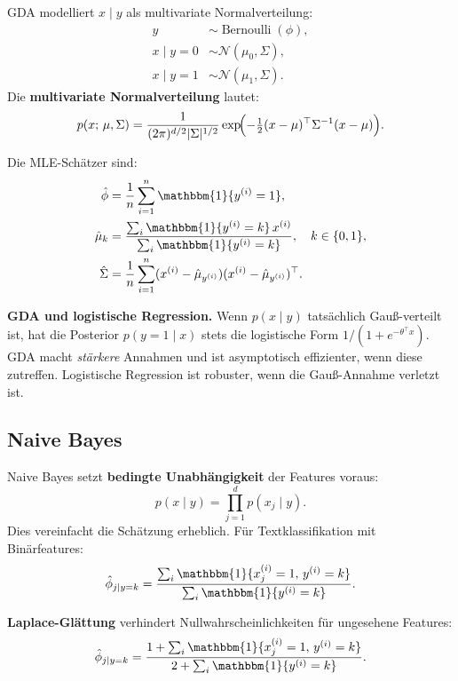 \documentclass[11pt]{article}
\theoremstyle{csthm}
\theoremstyle{csdef}
\newcommand{\I}{\mathbbm{1}}
\newcommand{\N}{\mathcal{N}}
\newcommand{\T}{^\top}
\begin{document}
GDA modelliert $x \mid y$ als multivariate Normalverteilung:
\begin{align}
  y &\sim \operatorname{Bernoulli}(\phi), \\
  x \mid y=0 &\sim \N(\mu_0, \Sigma), \\
  x \mid y=1 &\sim \N(\mu_1, \Sigma).
\end{align}
Die \textbf{multivariate Normalverteilung} lautet:
\begin{equation}
  p(x;\,\mu,\Sigma)
  = \frac{1}{(2\pi)^{d/2}|\Sigma|^{1/2}}
    \exp\!\Bigl(-\tfrac{1}{2}(x-\mu)\T\Sigma^{-1}(x-\mu)\Bigr).
\end{equation}

Die MLE-Schätzer sind:
\begin{align}
  \hat\phi &= \frac{1}{n}\sum_{i=1}^n \I\{y^{(i)}=1\}, \\
  \hat\mu_k &= \frac{\sum_i \I\{y^{(i)}=k\}\,x^{(i)}}
                    {\sum_i \I\{y^{(i)}=k\}},
  \quad k \in \{0,1\}, \\
  \hat\Sigma &= \frac{1}{n}\sum_{i=1}^n
    (x^{(i)} - \hat\mu_{y^{(i)}})(x^{(i)} - \hat\mu_{y^{(i)}})\T.
\end{align}

\begin{tcolorbox}[thmstyle]
\textbf{GDA und logistische Regression.}
Wenn $p(x \mid y)$ tatsächlich Gauß-verteilt ist, hat die Posterior
$p(y=1 \mid x)$ stets die logistische Form $1/(1+e^{-\theta\T x})$.
GDA macht \emph{stärkere} Annahmen und ist asymptotisch effizienter, wenn
diese zutreffen. Logistische Regression ist robuster, wenn die
Gauß-Annahme verletzt ist.
\end{tcolorbox}

\subsection{Naive Bayes}

Naive Bayes setzt \textbf{bedingte Unabhängigkeit} der Features voraus:
\begin{equation}
  p(x \mid y) = \prod_{j=1}^d p(x_j \mid y).
\end{equation}
Dies vereinfacht die Schätzung erheblich. Für Textklassifikation mit
Binärfeatures:
\begin{equation}
  \hat\phi_{j\mid y=k}
  = \frac{\sum_i \I\{x_j^{(i)}=1,\, y^{(i)}=k\}}
         {\sum_i \I\{y^{(i)}=k\}}.
\end{equation}

\textbf{Laplace-Glättung} verhindert Nullwahrscheinlichkeiten für
ungesehene Features:
\begin{equation}
  \hat\phi_{j\mid y=k}
  = \frac{1 + \sum_i \I\{x_j^{(i)}=1,\, y^{(i)}=k\}}
         {2 + \sum_i \I\{y^{(i)}=k\}}.
\end{equation}
\end{document}
